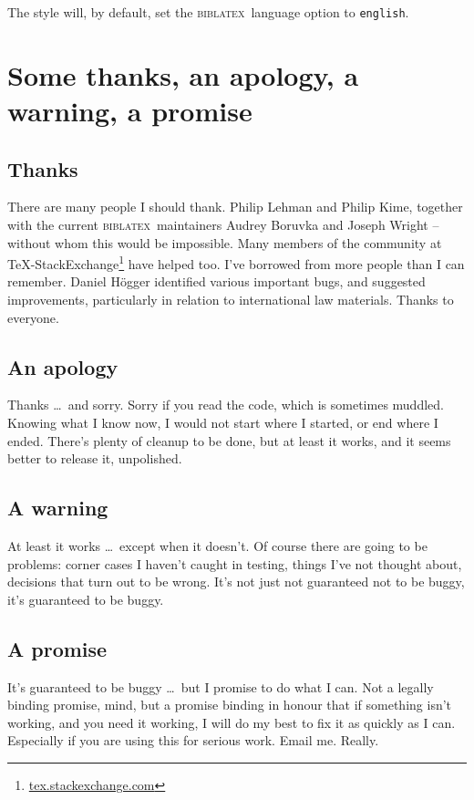 \documentclass[a4paper,
               11pt,
	       DIV=1,			   
	       footinclude=false]
	      {scrartcl}
\newcommand{\biblatex}{\textsc{biblatex}}
\begin{document}
The style will, by default, set the \biblatex\ language option to
\texttt{english}.

\section{Some thanks, an apology, a warning, a promise}

\subsection{Thanks}

There are many people I should thank. Philip Lehman and Philip Kime,
together with the current \biblatex\ maintainers Audrey Boruvka and
Joseph Wright -- without whom this would be impossible. Many members
of the community at
\TeX-StackExchange\footnote{\url{tex.stackexchange.com}} have helped
too. I've borrowed from more people than I can remember. Daniel
H\"ogger identified various important bugs, and suggested
improvements, particularly in relation to international law materials. Thanks to everyone.

\subsection{An apology}

Thanks \ldots\ and sorry. Sorry if you read the code, which is
sometimes muddled. Knowing what I know now, I would not start where I
started, or end where I ended. There's plenty of cleanup to be done,
but at least it works, and it seems better to release it, unpolished.

\subsection{A warning}

At least it works \ldots\ except when it doesn't. Of course there are
going to be problems: corner cases I haven't caught in testing, things
I've not thought about, decisions that turn out to be wrong. It's not
just not guaranteed not to be buggy, it's guaranteed to be
buggy.

\subsection{A promise}

It's guaranteed to be buggy \ldots\ but I promise to do what I
can. Not a legally binding promise, mind, but a promise binding in
honour that if something isn't working, and you need it working, I
will do my best to fix it as quickly as I can. Especially if you are
using this for serious work. Email
me. Really.
\end{document}

